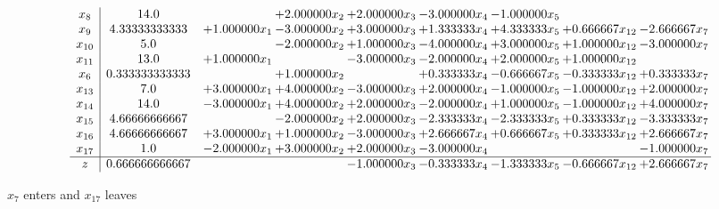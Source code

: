 \documentclass[10pt]{article}
\begin{document}
 \[\begin{array}{c| c c@{\hskip 2pt} c@{\hskip 2pt} c@{\hskip 2pt} c@{\hskip 2pt} c@{\hskip 2pt} c@{\hskip 2pt} c@{\hskip 2pt} }
 x_{8}   &  14.0  &   & + 2.000000 x_{2} & + 2.000000 x_{3} & -3.000000 x_{4} & -1.000000 x_{5} &    &   \\
 x_{9}   &  4.33333333333 & + 1.000000 x_{1} & -3.000000 x_{2} & + 3.000000 x_{3} & + 1.333333 x_{4} & + 4.333333 x_{5} & + 0.666667 x_{12} & -2.666667 x_{7}\\
 x_{10}   &  5.0  &   & -2.000000 x_{2} & + 1.000000 x_{3} & -4.000000 x_{4} & + 3.000000 x_{5} & + 1.000000 x_{12} & -3.000000 x_{7}\\
 x_{11}   &  13.0 & + 1.000000 x_{1} &   & -3.000000 x_{3} & -2.000000 x_{4} & + 2.000000 x_{5} & + 1.000000 x_{12} &   \\
 x_{6}   &  0.333333333333  &   & + 1.000000 x_{2} &   & + 0.333333 x_{4} & -0.666667 x_{5} & -0.333333 x_{12} & + 0.333333 x_{7}\\
 x_{13}   &  7.0 & + 3.000000 x_{1} & + 4.000000 x_{2} & -3.000000 x_{3} & + 2.000000 x_{4} & -1.000000 x_{5} & -1.000000 x_{12} & + 2.000000 x_{7}\\
 x_{14}   &  14.0 & -3.000000 x_{1} & + 4.000000 x_{2} & + 2.000000 x_{3} & -2.000000 x_{4} & + 1.000000 x_{5} & -1.000000 x_{12} & + 4.000000 x_{7}\\
 x_{15}   &  4.66666666667  &   & -2.000000 x_{2} & + 2.000000 x_{3} & -2.333333 x_{4} & -2.333333 x_{5} & + 0.333333 x_{12} & -3.333333 x_{7}\\
 x_{16}   &  4.66666666667 & + 3.000000 x_{1} & + 1.000000 x_{2} & -3.000000 x_{3} & + 2.666667 x_{4} & + 0.666667 x_{5} & + 0.333333 x_{12} & + 2.666667 x_{7}\\
 x_{17}   &  1.0 & -2.000000 x_{1} & + 3.000000 x_{2} & + 2.000000 x_{3} & -3.000000 x_{4} &    &   & -1.000000 x_{7}\\
\hline
z    &  0.666666666667  &    &   & -1.000000 x_{3} & -0.333333 x_{4} & -1.333333 x_{5} & -0.666667 x_{12} & + 2.666667 x_{7}\\
\end{array}\]


 $ x_{7} $ enters and $ x_{17} $ leaves 
\end{document}
